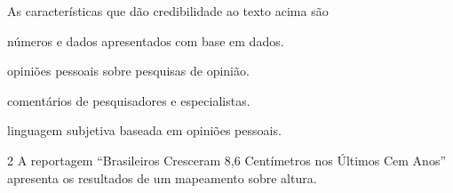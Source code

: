 As características que dão credibilidade ao texto acima são

\begin{escolha}
\item números e dados apresentados com base em dados.

\item opiniões pessoais sobre pesquisas de opinião.

\item comentários de pesquisadores e especialistas.

\item linguagem subjetiva baseada em opiniões pessoais.
\end{escolha}

\pagebreak
\num{2} A reportagem ``Brasileiros Cresceram 8,6 Centímetros nos Últimos Cem
Anos'' apresenta os resultados de um mapeamento sobre altura.

